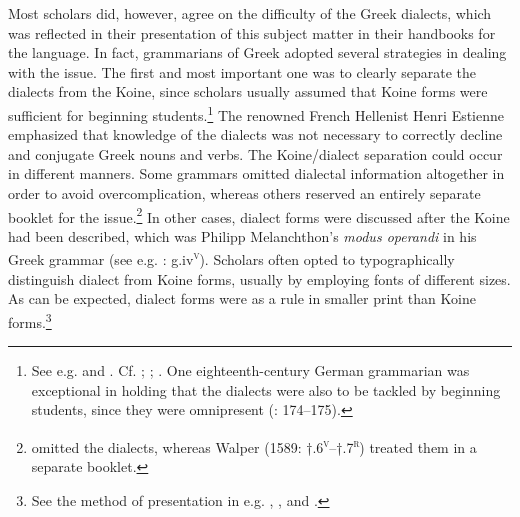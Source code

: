 Most scholars did, however, agree on the difficulty of the Greek dialects, which was reflected in their presentation of this subject matter in their handbooks for the language. In fact, grammarians of Greek adopted several strategies in dealing with the issue. The first and most important one was to clearly separate the dialects from the Koine, since scholars usually assumed that Koine forms were sufficient for beginning students.\footnote{See e.g. \citet[(i)]{Da1501} and \citet[223]{Tavoni1986}. Cf. \citet[aa.ii\textsc{\textsuperscript{v}}]{Glarean1524}; \citet[\textsc{a}.ii\textsc{\textsuperscript{v}}]{Metzler1529}; \citet[105]{Rollin1726}. One eighteenth-century German grammarian was exceptional in holding that the dialects were also to be tackled by beginning students, since they were omnipresent (\citealt{Trendelenburg1782}: 174–175).} The renowned French Hellenist Henri Estienne emphasized that knowledge of the dialects was not necessary to correctly decline and conjugate Greek nouns and verbs. The Koine/dialect separation could occur in different manners. Some grammars omitted dialectal information altogether in order to avoid overcomplication, whereas others reserved an entirely separate booklet for the issue.\footnote{\citet[\textsc{b.}iv\textsc{\textsuperscript{r}}]{Caselius1560} omitted the dialects, whereas Walper (1589: †.6\textsc{\textsuperscript{v}}–†.7\textsc{\textsuperscript{r}}) treated them in a separate booklet.} In other cases, dialect forms were discussed after the Koine had been described, which was Philipp Melanchthon’s \textit{modus operandi} in his Greek grammar (see e.g. \citealt{Melanchthon1518}: g.iv\textsc{\textsuperscript{v}}). Scholars often opted to typographically distinguish dialect from Koine forms, usually by employing fonts of different sizes. As can be expected, dialect forms were as a rule in smaller print than Koine forms.\footnote{See the method of presentation in e.g. \citet{Gretser1593}, \citet{Anon.1613}, and \citet{Lancelot1655}.}

